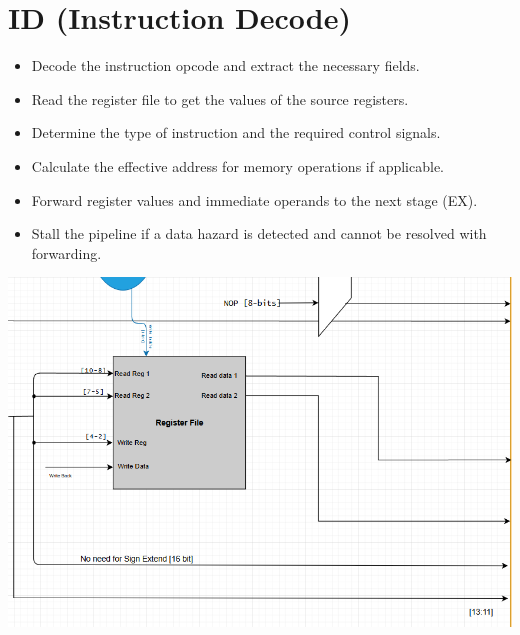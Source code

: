 \documentclass{report}
\begin{document}
\section*{ID (Instruction Decode)}
\begin{minipage}{0.6\textwidth}
\begin{itemize}
    \item Decode the instruction opcode and extract the necessary fields.
    \item Read the register file to get the values of the source registers.
    \item Determine the type of instruction and the required control signals.
    \item Calculate the effective address for memory operations if applicable.
    \item Forward register values and immediate operands to the next stage (EX).
    \item Stall the pipeline if a data hazard is detected and cannot be resolved with forwarding.
\end{itemize}
\end{minipage}
\begin{minipage}{0.35\textwidth}
\begin{center}
    \includegraphics[width=\textwidth]{./assets/ID.png}
\end{center}
\end{minipage}
\end{document}
